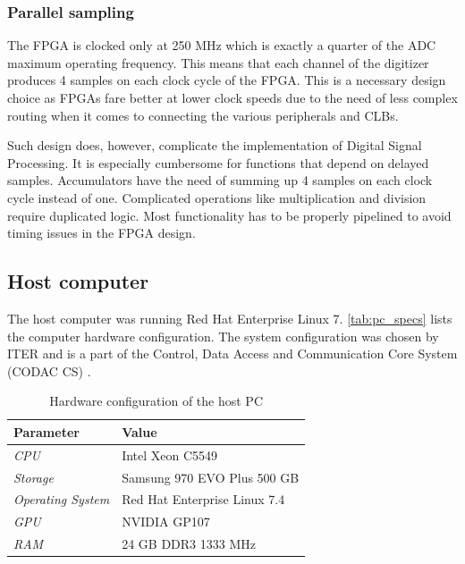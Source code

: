 \subsubsection{Parallel sampling} \label{sssec:parallel_sampling}

The FPGA is clocked only at 250 MHz which is exactly a quarter of 
the ADC maximum operating frequency. This means that each channel
of the digitizer produces 4 samples on each clock cycle of the 
FPGA. This is a necessary design choice as FPGAs fare better 
at lower clock speeds due to the need of less complex routing
when it comes to connecting the various peripherals and CLBs.


Such design does, however, complicate the implementation of 
Digital Signal Processing. It is especially cumbersome for 
functions that depend on delayed samples.
Accumulators have the need of summing up 4 samples on
each clock cycle instead of one. Complicated operations
like multiplication and division require duplicated logic.
Most functionality has to be properly pipelined to avoid
timing issues in the FPGA design.

\subsection{Host computer}

The host computer was running Red Hat Enterprise Linux 7.
\autoref{tab:pc_specs} lists the computer hardware configuration.
The system configuration was chosen by ITER and is a part of the 
Control, Data Access and Communication Core System (CODAC CS)
\cite{codac}.
\begin{table}[H]
\caption{Hardware configuration of the host PC}
\centering
  \begin{tabular}{l | l}
  {\bfseries Parameter} & {\bfseries Value}\\
  \hline
  \textit {CPU}             & Intel Xeon C5549 \\ \hline
  \textit {Storage}  & Samsung 970 EVO Plus 500 GB \\ \hline
  \textit {Operating System}   & Red Hat Enterprise Linux 7.4\\ \hline
  \textit {GPU}         & NVIDIA GP107 \\ \hline
  \textit {RAM}      & 24 GB DDR3 1333 MHz\\ 
  \end{tabular}
  \label{tab:pc_specs}
\end{table}

